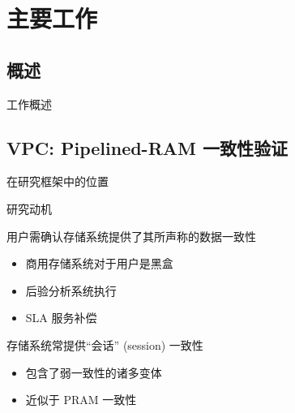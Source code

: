 \section{主要工作}

\subsection{概述}

\begin{frame}{工作概述}
\end{frame}
\subsection{VPC: Pipelined-RAM 一致性验证}

\begin{frame}{在研究框架中的位置}
\end{frame}

\begin{frame}{研究动机}
  \vspace{0.50cm}

  \begin{description}
    \setlength{\itemsep}{5pt}
    \item[验证:] 用户需确认存储系统提供了其所声称的数据一致性  
      \begin{itemize}
        \item 商用存储系统对于用户是黑盒
        \item 后验分析系统执行
        \item SLA 服务补偿 
      \end{itemize}
    \item[PRAM:] 存储系统常提供``会话'' (session) 一致性 
       
      \begin{itemize}
	\item 包含了弱一致性的诸多变体 
	\item 近似于 PRAM 一致性  
      \end{itemize}
  \end{description}
\end{frame}

